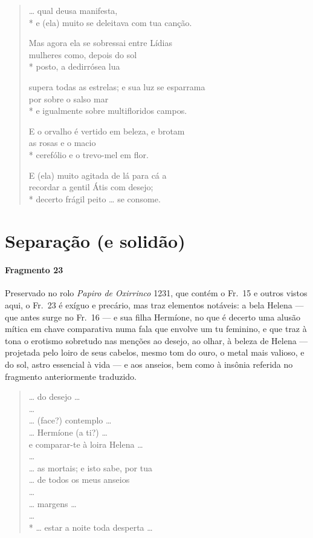 \begin{verse}
\ldots{} qual deusa manifesta,\\*
e (ela) muito se deleitava com tua canção.

Mas agora ela se sobressai entre Lídias\\
mulheres como, depois do sol\\*
posto, a dedirrósea lua

supera todas as estrelas; e sua luz se \qb{}esparrama\\
por sobre o salso mar \\*
e igualmente sobre multifloridos campos.

E o orvalho é vertido em beleza, e brotam\\
as rosas e o macio \\*
cerefólio e o trevo-mel em flor.

E (ela) muito agitada de lá para cá a \\
recordar a gentil Átis com desejo;\\*
decerto frágil peito \ldots{} se consome.
\end{verse}


\section{Separação (e solidão)}

\paragraph{Fragmento 23}

{\small Preservado no rolo \textit{Papiro de Oxirrinco} 1231, que contém o Fr.~15 e outros vistos aqui, o Fr.~23 é exíguo e precário, mas traz elementos notáveis: a bela Helena --- que antes surge no Fr.~16 --- e sua filha Hermíone, no que é decerto uma alusão mítica em chave comparativa numa fala que envolve um tu feminino, e que traz à tona o erotismo sobretudo nas menções ao desejo, ao olhar, à beleza de Helena --- projetada pelo loiro de seus cabelos, mesmo tom do ouro, o metal mais valioso, e do sol, astro essencial à vida --- e aos anseios, bem como à insônia referida no fragmento anteriormente traduzido.}

\begin{verse}
\ldots{} do desejo \ldots{}\\
\ldots{}\\
\ldots{} (face?) contemplo \ldots{}\\
\ldots{} Hermíone (a ti?) \ldots{}\\
e comparar-te à loira Helena \ldots{}\\
\ldots{}\\
\ldots{} as mortais; e isto sabe, por tua\\
\ldots{} de todos os meus anseios\\
\ldots{}\\
\ldots{} margens \ldots{}\\
\ldots{}\\*
\ldots{} estar a noite toda desperta \ldots{} 
\end{verse}

